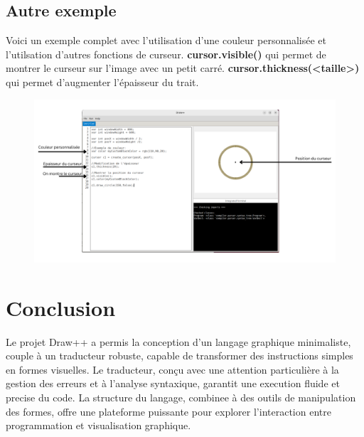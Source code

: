 \documentclass[12pt,a4paper]{report}
\begin{document}
\newpage
\section{Autre exemple}
Voici un exemple complet avec l'utilisation d'une couleur personnalisée et l'utilsation d'autres fonctions de curseur. \textbf{cursor.visible()} qui permet de montrer le curseur sur l'image avec un petit carré. \textbf{cursor.thickness(<taille>)} qui permet d'augmenter l'épaisseur du trait.
\begin{figure}[H]
    \centering
    \includegraphics[width=1.2\textwidth]{assets/ide/image3.png}
\end{figure}

 \chapter{Conclusion}

Le projet Draw++ a permis la conception d'un langage graphique minimaliste, couple à un traducteur robuste, capable de transformer des instructions simples en formes visuelles. Le traducteur, conçu avec une attention particulière à la gestion des erreurs et à l’analyse syntaxique, garantit une execution fluide et precise du code. La structure du langage, combinee à des outils de manipulation des formes, offre une plateforme puissante pour explorer l'interaction entre programmation et visualisation graphique.
\end{document}
